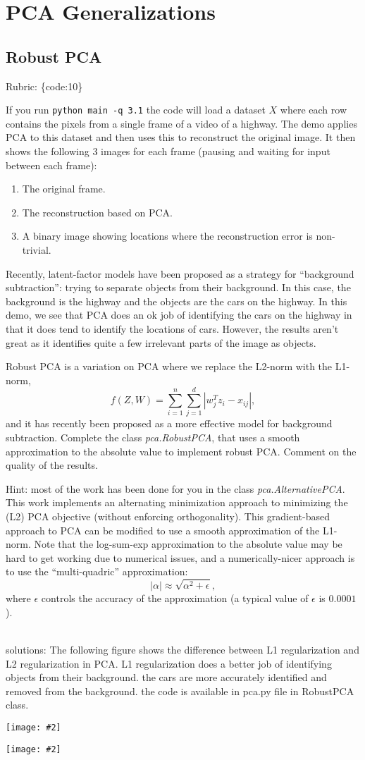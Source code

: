 \documentclass{article}
\def\rubric#1{\gre{Rubric: \{#1\}}}{}
\def\blu#1{{\color{blu}#1}}
\def\gre#1{{\color{gre}#1}}
\newcommand{\centerfig}[2]{\begin{center}\texttt{[image: \#2]}\end{center}}
\def\enum#1{\begin{enumerate}#1\end{enumerate}}
\begin{document}
\section{PCA Generalizations}

\subsection{Robust PCA}
\rubric{code:10}

If you run \verb|python main -q 3.1| the code will load a dataset $X$ where each row contains the pixels from a single frame of a video of a highway. The demo applies PCA to this dataset and then uses this to reconstruct the original image.
It then shows the following 3 images for each frame (pausing and waiting for input between each frame):
\enum{
\item The original frame.
\item The reconstruction based on PCA.
\item A binary image showing locations where the reconstruction error is non-trivial.
}
Recently, latent-factor models have been proposed as a strategy for ``background subtraction'': trying to separate objects from their background. In this case, the background is the highway and the objects are the cars on the highway. In this demo, we see that PCA does an ok job of identifying the cars on the highway in that it does tend to identify the locations of cars. However, the results aren't great as it identifies quite a few irrelevant parts of the image as objects.

Robust PCA is a variation on PCA where we replace the L2-norm with the L1-norm,
\[
f(Z,W) = \sum_{i=1}^n\sum_{j=1}^d |w_j^Tz_i - x_{ij}|,
\]
and it has recently been proposed as a more effective model for background subtraction. \blu{Complete the class \emph{pca.RobustPCA},
that uses a smooth approximation to the absolute value to implement robust PCA. Comment on the quality of the results.}

Hint: most of the work has been done for you in the class \emph{pca.AlternativePCA}.
This work implements an alternating minimization approach to minimizing the (L2) PCA objective (without enforcing orthogonality). This gradient-based approach to PCA can be modified to use a smooth approximation of the L1-norm. Note that the log-sum-exp approximation to the absolute value may be hard to get working due to numerical issues, and a numerically-nicer approach is to use the ``multi-quadric'' approximation:
\[
|\alpha| \approx \sqrt{\alpha^2 + \epsilon},
\]
where $\epsilon$ controls the accuracy of the approximation (a typical value of $\epsilon$ is $0.0001$).  \\ \\
\gre{solutions: The following figure shows the difference between L1 regularization and L2 regularization in PCA. L1 regularization does a better job of identifying objects from their background. the cars are more accurately identified and removed from the background. the code is available in pca.py file in RobustPCA class.
\centerfig{.5}{../figs/highway_001.jpg}
\centerfig{.5}{../figs/highway_002.jpg} }
\end{document}
